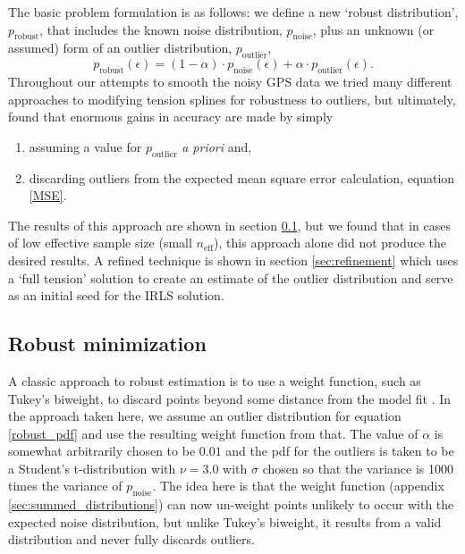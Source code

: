 \documentclass[10pt,journal]{IEEEtran}
\begin{document}
The basic problem formulation is as follows: we define a new `robust distribution', $p_{\textrm{robust}}$, that includes the known noise distribution, $p_{\textrm{noise}}$, plus an unknown (or assumed) form of an outlier distribution, $p_{\textrm{outlier}}$,
\begin{equation}
\label{robust_pdf}
    p_{\textrm{robust}}(\epsilon) = (1-\alpha) \cdot p_{\textrm{noise}}(\epsilon) + \alpha \cdot  p_{\textrm{outlier}}(\epsilon).
\end{equation}
Throughout our attempts to smooth the noisy GPS data we tried many different approaches to modifying tension splines for robustness to outliers, but ultimately, found that enormous gains in accuracy are made by simply
\begin{enumerate}
    \item assuming a value for $p_{\textrm{outlier}}$ \emph{a priori} and,
    \item discarding outliers from the expected mean square error calculation, equation \ref{MSE}.
\end{enumerate}
The results of this approach are shown in section \ref{sec:robust_minimization}, but we found that in cases of low effective sample size (small $n_\textrm{eff}$), this approach alone did not produce the desired results. A refined technique is shown in section \ref{sec:refinement} which uses a `full tension' solution to create an estimate of the outlier distribution and serve as an initial seed for the IRLS solution.

\subsection{Robust minimization}
\label{sec:robust_minimization}

A classic approach to robust estimation is to use a weight function, such as Tukey's biweight, to discard points beyond some distance from the model fit \cite{press1992-book}. In the approach taken here, we assume an outlier distribution for equation \ref{robust_pdf} and use the resulting weight function from that. The value of $\alpha$ is somewhat arbitrarily chosen to be $0.01$ and the pdf for the outliers is taken to be a Student's t-distribution with $\nu=3.0$ with $\sigma$ chosen so that the variance is 1000 times the variance of $p_{\textrm{noise}}$. The idea here is that the weight function (appendix \ref{sec:summed_distributions}) can now un-weight points unlikely to occur with the expected noise distribution, but unlike Tukey's biweight, it results from a valid distribution and never fully discards outliers.
\end{document}
